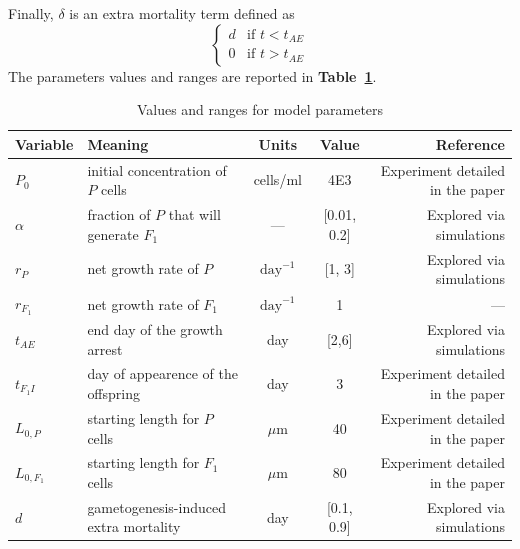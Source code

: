 \documentclass[a4paper,oneside]{article}
\begin{document}
    Finally, $\delta$ is an extra mortality term defined as
    \[
      \begin{cases}
        d & \mbox{if } t < t_{AE} \\
        0 & \mbox{if } t > t_{AE}
      \end{cases}
    \]
    The parameters values and ranges are reported in \textbf{Table~\ref{tbl1}}.
    \begin{table}
      \centering
      {%
        \begin{tabular}{@{}llccr@{}}
          \toprule
          \textbf{Variable}&\textbf{Meaning} & \textbf{Units} & \textbf{Value} & \textbf{Reference}\\
          \midrule
          ${P}_{0}$       & initial concentration of $P$ cells         & cells/ml          & 4E3         & Experiment detailed in the paper\\
          $\alpha$        & fraction of $P$ that will generate $F_{1}$ & ---               & [0.01, 0.2] & Explored via simulations\\
          $r_{P}$         & net growth rate of $P$                     & $\text{day}^{-1}$ & [1, 3]      & Explored via simulations\\ 
          $r_{F_{1}}$     & net growth rate of $F_{1}$                 & $\text{day}^{-1}$ & 1           & ---\\
          $t_{AE}$        & end day of the growth arrest               & day               & [2,6]       & Explored via simulations\\
          $t_{F_{1}I}$    & day of appearence of the offspring         & day               & 3           & Experiment detailed in the paper\\
          $L_{0,P}$       & starting length for $P$ cells              & $\mu$m            & 40          & Experiment detailed in the paper\\
          $L_{0,{F_{1}}}$ & starting length for $F_{1}$ cells          & $\mu$m            & 80          & Experiment detailed in the paper\\
          $d$             & gametogenesis-induced extra mortality      & day               & [0.1, 0.9]  & Explored via simulations\\
          \bottomrule
        \end{tabular}
       }
      \caption{Values and ranges for model parameters}\label{tbl1}
    \end{table}
%
\end{document}
